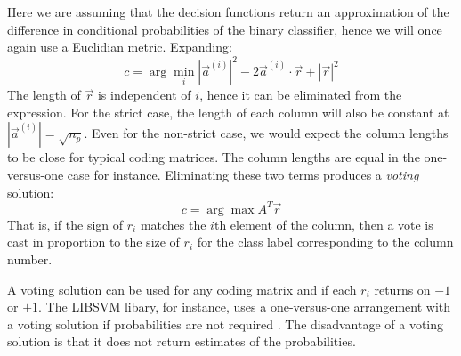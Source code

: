 \documentclass{article}
\begin{document}
Here we are assuming that the decision functions return an approximation of the 
difference in conditional probabilities of the binary classifier, hence we will once again use a
Euclidian metric. Expanding:
\begin{equation}
	c = \arg \min_i |\vec a^{(i)}|^2 - 2 \vec a^{(i)} \cdot \vec r + |\vec r|^2
\end{equation}
The length of $\vec r$ is independent of $i$, hence it can be eliminated from the expression.
For the strict case, the length of each column will also be constant at $|\vec a^{(i)}|=\sqrt{n_p}$.
Even for the non-strict case, we would expect the column lengths to be close for typical coding 
matrices. The column lengths are equal in the one-versus-one case for instance.
Eliminating these two terms produces a {\it voting} solution:
\begin{equation}
	c = \arg \max A^T \vec r
\end{equation}
That is, if the sign of $r_i$ matches the $i$th element of the column, then a vote is cast 
in proportion to the size of $r_i$ for the class label corresponding to the column number.

A voting solution can be used for any coding matrix and if each $r_i$ returns on $-1$ or 
$+1$.  The LIBSVM libary, for instance, uses a one-versus-one arrangement with a voting
solution if probabilities are not required \citep{Chang_Lin2011}.
The disadvantage of a voting solution is
that it does not return estimates of the probabilities.


\end{document}
